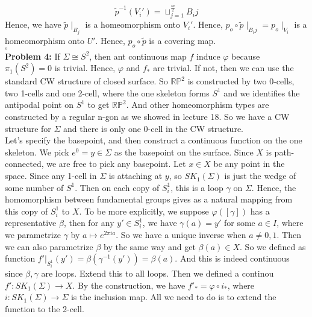 \documentclass[12pt]{amsart}
\newcommand{\rp}{\mathbb{RP}^2}
\begin{document}
\[\tilde{p}^{-1}(V_i')=\sqcup_{j=1}^{\frac{m}{2}}B_ij\]
Hence, we have $\tilde{p}\mid_{B_j}$ is a homeomorphism onto $V_i'$. Hence, $p_o\circ \tilde{p}\mid_{B_ij}=p_o\mid_{V_i}$ is a homeomorphism onto $U'$. Hence, $p_o\circ \tilde{p}$ is a covering map.
\\\phantom{qed}\hfill$\square$\\
\textbf{Problem 4:} If $\Sigma\cong S^2$, then ant continuous map $f$ induce $\varphi$ because $\pi_1(S^2)=0$ is trivial. Hence, $\varphi$ and $f_\ast$ are trivial. If not, then we can use the standard CW structure of closed surface. So $\rp$ is constructed by two 0-cells, two 1-cells and one 2-cell, where the one skeleton forms $S^1$ and we identifies the antipodal point on $S^1$ to get $\rp$. And other homeomorphism types are constructed by a regular n-gon as we showed in lecture 18. So we have a CW structure for $\Sigma$ and there is only one 0-cell in the CW structure.\\
Let's specify the basepoint, and then construct a continuous function on the one skeleton. We pick $e^0=y\in \Sigma$ as the basepoint on the surface. Since $X$ is path-connected, we are free to pick any basepoint. Let $x\in X$ be any point in the space. Since any 1-cell in $\Sigma$ is attaching at $y$, so $SK_1(\Sigma)$ is just the wedge of some number of $S^1$. Then on each copy of $S^1_i$, this is a loop $\gamma $ on $\Sigma$. Hence, the homomorphism between fundamental groups gives as a natural mapping from this copy of $S^1_i$ to $X$. To be more explicitly, we suppose $\varphi([\gamma])$ has a representative $\beta$, then for any $y'\in S^1_i$, we have $\gamma(a)=y'$ for some $a\in I$, where we parametrize $\gamma$ by $a\mapsto e^{2\pi ia}$. So we have a unique inverse when $a\neq 0,1$. Then we can also parametrize $\beta$ by the same way and get $\beta(a)\in X$. So we defined as function $f'|_{S^1_i}(y')=\beta(\gamma^{-1}(y'))=\beta(a)$. And this is indeed continuous since $\beta,\gamma$ are loops. Extend this to all loops. Then we defined a continou $f':SK_1(\Sigma)\to X$. By the construction, we have $f'_\ast=\varphi\circ i_\ast$, where $i:SK_1(\Sigma)\to \Sigma$ is the inclusion map. All we need to do is to extend the function to the 2-cell.\\
\end{document}
